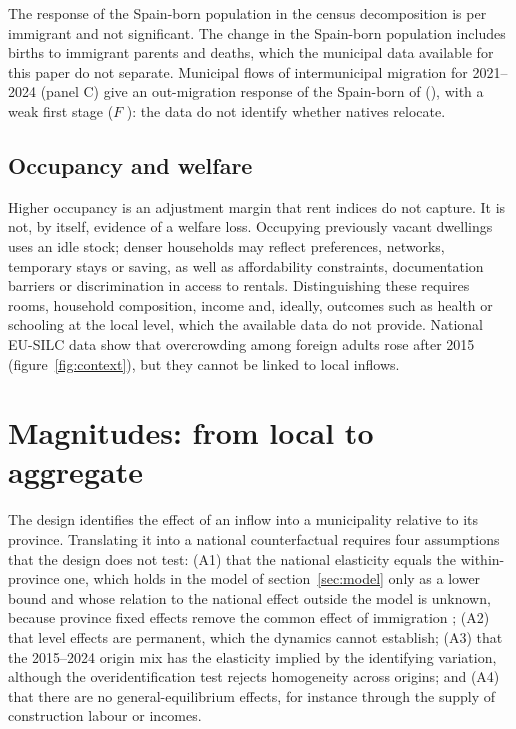 \documentclass[11pt,a4paper]{article}
\begin{document}
The response of the Spain-born population in the census decomposition is \natC{} per immigrant and not significant. The change in the Spain-born population includes births to immigrant parents and deaths, which the municipal data available for this paper do not separate. Municipal flows of intermunicipal migration for 2021--2024 (panel C) give an out-migration response of the Spain-born of \outES{} (\outESse), with a weak first stage ($F$ \outESF): the data do not identify whether natives relocate.

\subsection{Occupancy and welfare}

Higher occupancy is an adjustment margin that rent indices do not capture. It is not, by itself, evidence of a welfare loss. Occupying previously vacant dwellings uses an idle stock; denser households may reflect preferences, networks, temporary stays or saving, as well as affordability constraints, documentation barriers or discrimination in access to rentals. Distinguishing these requires rooms, household composition, income and, ideally, outcomes such as health or schooling at the local level, which the available data do not provide. National EU-SILC data show that overcrowding among foreign adults rose after 2015 (figure~\ref{fig:context}), but they cannot be linked to local inflows.

\section{Magnitudes: from local to aggregate}\label{sec:magnitude}

The design identifies the effect of an inflow into a municipality relative to its province. Translating it into a national counterfactual requires four assumptions that the design does not test: (A1) that the national elasticity equals the within-province one, which holds in the model of section~\ref{sec:model} only as a lower bound and whose relation to the national effect outside the model is unknown, because province fixed effects remove the common effect of immigration \citep{chodorowreich2020,wolf2023}; (A2) that level effects are permanent, which the dynamics cannot establish; (A3) that the 2015--2024 origin mix has the elasticity implied by the identifying variation, although the overidentification test rejects homogeneity across origins; and (A4) that there are no general-equilibrium effects, for instance through the supply of construction labour or incomes.
\end{document}
